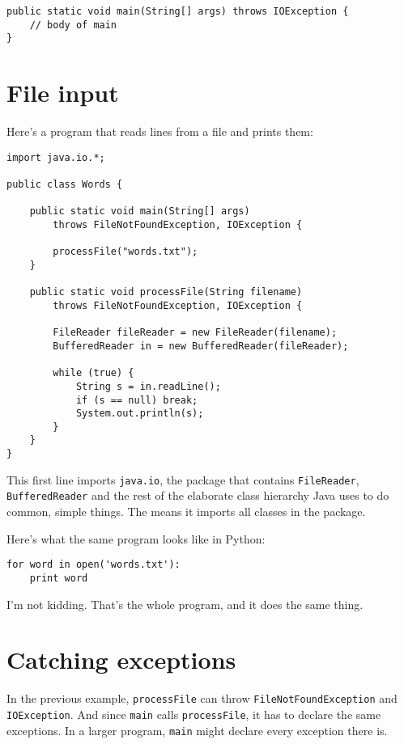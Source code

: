 \documentclass[12pt]{book}
\theoremstyle{definition}
\begin{document}
\begin {lstlisting}
public static void main(String[] args) throws IOException {
    // body of main
}
\end{lstlisting}


\section{File input}
\label{fileIO}

Here's a program that reads lines from a file and prints them:

\begin{lstlisting}
import java.io.*;

public class Words {

    public static void main(String[] args)
        throws FileNotFoundException, IOException {
	
        processFile("words.txt");
    }

    public static void processFile(String filename)
        throws FileNotFoundException, IOException {

        FileReader fileReader = new FileReader(filename);
        BufferedReader in = new BufferedReader(fileReader);

        while (true) {
            String s = in.readLine();
            if (s == null) break;
            System.out.println(s);
        }
    }
}
\end{lstlisting}

This first line imports {\tt java.io}, the package that contains
{\tt FileReader}, {\tt BufferedReader} and the rest of
the elaborate class hierarchy Java uses to do
common, simple things.  The {\tt *} means it imports all classes
in the package.

Here's what the same program looks like in Python:

\begin{verbatim}
for word in open('words.txt'):
    print word
\end{verbatim}

I'm not kidding.  That's the whole program, and it does the same thing.


\section{Catching exceptions}

In the previous example, {\tt processFile} can throw 
{\tt FileNotFoundException} and {\tt IOException}.  And since
{\tt main} calls {\tt processFile}, it has to declare the
same exceptions.  In a larger program, {\tt main} might
declare every exception there is.
\end{document}

